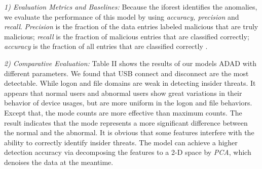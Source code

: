 \documentclass[conference]{IEEEtran}
\begin{document}
\emph{1) Evaluation Metrics and Baselines:}
Because the iforest identifies the anomalies, we evaluate the performance of this model by using \emph{accuracy, precision} and \emph{recall}.  
\emph{Precision} is the
fraction of the data entries labeled malicious that are
truly malicious; \emph{recall} is the fraction of malicious entries that are
classified correctly; \emph{accuracy} is the fraction of all entries
that are classified correctly \cite{b22}.

\emph{2) Comparative Evaluation:} Table II shows the results of our models ADAD with different parameters.
We found that USB connect and disconnect are the most detectable. While logon and file domains are weak in detecting insider threats. It appears that normal users and abnormal users show great variations in their behavior of device usages, but are more uniform in the logon and file behaviors. Except that, the mode counts are more effective than maximum counts. The result indicates that the mode represents a more significant difference between the normal and the abnormal. It is obvious that some features interfere with the ability to correctly identify insider threats. 
The model can achieve a higher detection accuracy via decomposing the features to a 2-D space by \emph{PCA}, which denoises the data at the meantime.
\end{document}
